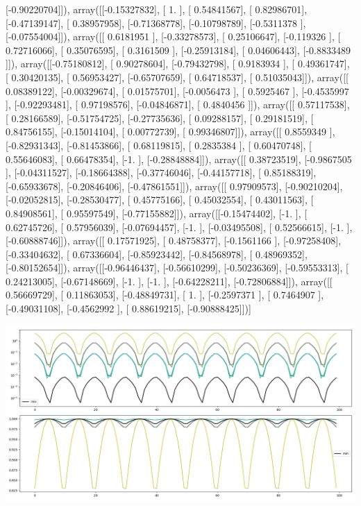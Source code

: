 \documentclass{article}
\begin{document}
       [-0.90220704]]), array([[-0.15327832],
       [ 1.        ],
       [ 0.54841567],
       [ 0.82986701],
       [-0.47139147],
       [ 0.38957958],
       [-0.71368778],
       [-0.10798789],
       [-0.5311378 ],
       [-0.07554004]]), array([[ 0.6181951 ],
       [-0.33278573],
       [ 0.25106647],
       [-0.119326  ],
       [ 0.72716066],
       [ 0.35076595],
       [ 0.3161509 ],
       [-0.25913184],
       [ 0.04606443],
       [-0.8833489 ]]), array([[-0.75180812],
       [ 0.90278604],
       [-0.79432798],
       [ 0.9183934 ],
       [ 0.49361747],
       [ 0.30420135],
       [ 0.56953427],
       [-0.65707659],
       [ 0.64718537],
       [ 0.51035043]]), array([[ 0.08389122],
       [-0.00329674],
       [ 0.01575701],
       [-0.0056473 ],
       [ 0.5925467 ],
       [-0.4535997 ],
       [-0.92293481],
       [ 0.97198576],
       [-0.04846871],
       [ 0.4840456 ]]), array([[ 0.57117538],
       [ 0.28166589],
       [-0.51754725],
       [-0.27735636],
       [ 0.09288157],
       [ 0.29181519],
       [ 0.84756155],
       [-0.15014104],
       [ 0.00772739],
       [ 0.99346807]]), array([[ 0.8559349 ],
       [-0.82931343],
       [-0.81453866],
       [ 0.68119815],
       [ 0.2835384 ],
       [ 0.60470748],
       [ 0.55646083],
       [ 0.66478354],
       [-1.        ],
       [-0.28848884]]), array([[ 0.38723519],
       [-0.9867505 ],
       [-0.04311527],
       [-0.18664388],
       [-0.37746046],
       [-0.44157718],
       [ 0.85188319],
       [-0.65933678],
       [-0.20846406],
       [-0.47861551]]), array([[ 0.97909573],
       [-0.90210204],
       [-0.02052815],
       [-0.28530477],
       [ 0.45775166],
       [ 0.45032554],
       [ 0.43011563],
       [ 0.84908561],
       [ 0.95597549],
       [-0.77155882]]), array([[-0.15474402],
       [-1.        ],
       [ 0.62745726],
       [ 0.57956039],
       [-0.07694457],
       [-1.        ],
       [-0.03495508],
       [ 0.52566615],
       [-1.        ],
       [-0.60888746]]), array([[ 0.17571925],
       [ 0.48758377],
       [-0.1561166 ],
       [-0.97258408],
       [-0.33404632],
       [ 0.67336604],
       [-0.85923442],
       [-0.84568978],
       [ 0.48969352],
       [-0.80152654]]), array([[-0.96446437],
       [-0.56610299],
       [-0.50236369],
       [-0.59553313],
       [ 0.24213005],
       [-0.67148669],
       [-1.        ],
       [-1.        ],
       [-0.64228211],
       [-0.72806884]]), array([[ 0.56669729],
       [ 0.11863053],
       [-0.48849731],
       [ 1.        ],
       [-0.2597371 ],
       [ 0.7464907 ],
       [-0.49031108],
       [-0.4562992 ],
       [ 0.88619215],
       [-0.90888425]])]
\begin{center}
\includegraphics[scale=.9]{report_pickled_controls7/control_dpn_all}

\end{center}
\end{document}
